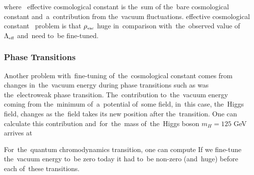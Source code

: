 where
\DIFdelbegin {}\DIFdelend \DIFaddbegin {}\DIFaddend ~effective cosmological constant \DIFaddbegin \DIFadd{$\Lambda\eff$ }\DIFaddend is the~sum of the~bare cosmological constant and~a~contribution \DIFdelbegin {}\DIFdelend from the~vacuum fluctuations. \DIFdelbegin {}\DIFdelend \DIFaddbegin {}\DIFaddend effective cosmological constant \DIFdelbegin {}\DIFdelend \DIFaddbegin {}\DIFaddend ~problem is that $\rho_\text{\tiny vac}$ \DIFdelbegin {}\DIFdelend \DIFaddbegin {}\DIFaddend huge in~comparison with~the~observed value of~$\Lambda\eff$ and~need to~be fine-tuned.
\subsubsection{Phase Transitions}
\begin{sloppypar}
Another problem with~fine-tuning of~the~cosmological constant comes from changes in~the~vacuum energy during phase transitions such as was the~electroweak phase transition. The~contribution to~the~vacuum energy coming from the~minimum of~a~potential of~some field, in~this case, the~Higgs field, changes as the~field takes its new position after the~transition. One can calculate this contribution \parencite{2012CRPhy..13..566M} and~for~the~mass of~the~Higgs boson $m_H=125$ GeV arrives at
\end{sloppypar}
For~the~quantum chromodynamics transition, one can compute
If we fine-tune the~vacuum energy to~be zero today it had to~be non-zero (and~huge) before each of~these transitions.

